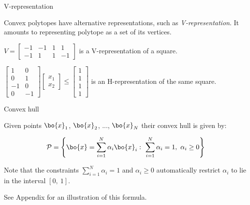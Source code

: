 \documentclass{beamer}
\begin{document}
\begin{frame}{V-representation}
\begin{flushleft}

Convex polytopes have alternative representations, such as \emph{V-representation}. It amounts to representing polytope as a set of its vertices.

\begin{example}
$V = \begin{bmatrix} -1 & -1 & 1 & 1 \\ -1 & 1 & 1 & -1 \end{bmatrix}$ is a V-representation of a square.
\end{example}

\begin{example}
$\begin{bmatrix} 1 & 0 \\ 0 & 1 \\ -1 & 0 \\ 0 & -1 \end{bmatrix}
\begin{bmatrix} x_1 \\ x_2 \end{bmatrix} \leq
\begin{bmatrix} 1 \\ 1 \\ 1 \\ 1 \end{bmatrix}$
is an H-representation of the same square.
\end{example}
 
\end{flushleft}
\end{frame}


\begin{frame}{Convex hull}
	\begin{flushleft}
		
		Given points $\bo{x}_1$, $\bo{x}_2$, ..., $\bo{x}_N$ their convex hull is given by:
		
		\begin{equation}
			\mathcal{P} = \left \{  \bo{x} = \sum_{i=1}^{N} \alpha_i\bo{x}_i: \   \sum_{i=1}^{N} \alpha_i = 1, \  \alpha_i \geq 0 \right \}
		\end{equation}
		
		
		\bigskip
		
		Note that the constraints $\sum_{i=1}^{N} \alpha_i = 1$ and $\alpha_i \geq 0$ automatically restrict $\alpha_i$ to lie in the interval $[0, \ 1]$.
		
		\bigskip
		
		See Appendix for an illustration of this formula.
		
	\end{flushleft}
\end{frame}
\end{document}

